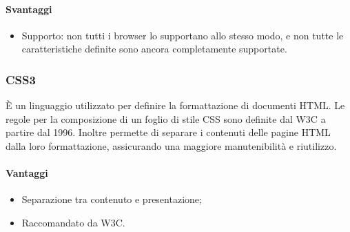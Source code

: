 \paragraph{Svantaggi}
\begin{itemize}
\item Supporto: non tutti i browser lo supportano allo stesso modo, e non tutte le caratteristiche definite sono ancora completamente supportate.
\end{itemize}

\subsubsection{CSS3}
È un linguaggio utilizzato per definire la formattazione di documenti HTML.
Le regole per la composizione di un foglio di stile CSS sono definite dal W3C
a partire dal 1996. Inoltre permette di separare i contenuti delle pagine HTML dalla loro formattazione, assicurando una maggiore manutenibilità e riutilizzo.

\paragraph{Vantaggi}
\begin{itemize}
\item Separazione tra contenuto e presentazione;
\item Raccomandato da W3C.
\end{itemize}
